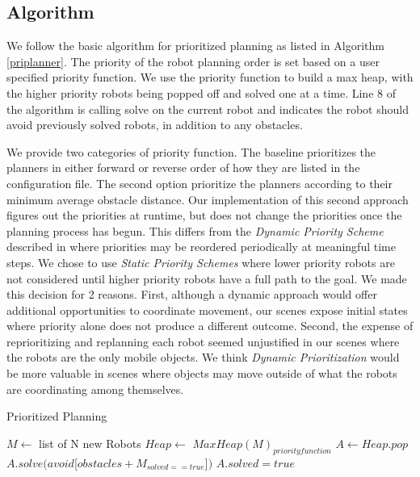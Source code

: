 \documentclass[12pt,journal,compsoc]{IEEEtran}
\begin{document}
\subsection{Algorithm}
We follow the basic algorithm for prioritized planning as listed in Algorithm \ref{priplanner}. The priority of the robot planning order is set based on a user specified priority function. We use the priority function to build a max heap, with the higher priority robots being popped off and solved one at a time. Line 8 of the algorithm is calling solve on the current robot and indicates the robot should avoid previously solved robots, in addition to any obstacles.
\par
We provide two categories of priority function. The baseline prioritizes the planners in either forward or reverse order of how they are listed in the configuration file. The second option prioritize the planners according to their minimum average obstacle distance. Our implementation of this second approach figures out the priorities at runtime, but does not change the priorities once the planning process has begun. This differs from the \emph{Dynamic Priority Scheme} described in \cite{slides} where priorities may be reordered periodically at meaningful time steps. We chose to use \emph{Static Priority Schemes} where lower priority robots are not considered until higher priority robots have a full path to the goal. We made this decision for 2 reasons. First, although a dynamic approach would offer additional opportunities to coordinate movement, our scenes expose initial states where priority alone does not produce a different outcome. Second, the expense of reprioritizing and replanning each robot seemed unjustified in our scenes where the robots are the only mobile objects. We think \emph{Dynamic Prioritization} would be more valuable in scenes where objects may move outside of what the robots are coordinating among themselves.

\begin{algorithm}
\caption{Prioritized Planning}\label{priplanner}
\begin{algorithmic}[1]
\State $M \gets$ list of N new Robots
\State $Heap \gets$ $MaxHeap(M)_{priority function}$
	\State $A \gets Heap.pop$
	\State $A.solve(avoid$[$obstacles + M_{solved==true}$]$)$
	\State $A.solved = true$
\EndWhile
\end{algorithmic}
\end{algorithm}
\end{document}
